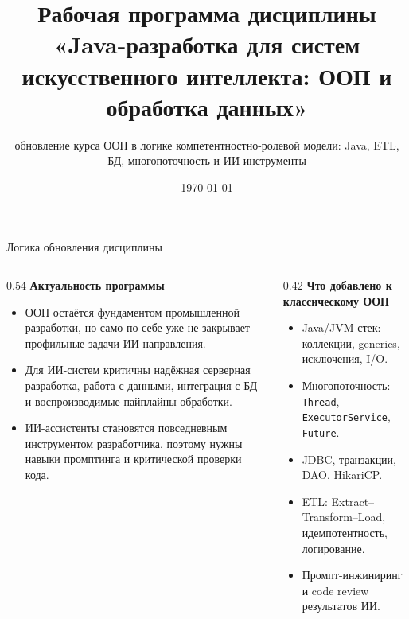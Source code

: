 \documentclass[aspectratio=169,10pt]{beamer}
\title[РПД: Java-разработка для систем ИИ]{Рабочая программа дисциплины\\«Java-разработка для систем искусственного интеллекта: ООП и обработка данных»}
\subtitle{обновление курса ООП в логике компетентностно-ролевой модели: Java, ETL, БД, многопоточность и ИИ-инструменты}
\date{\today}
\begin{document}
\begin{frame}
  \titlepage
\end{frame}

\begin{frame}{Логика обновления дисциплины}
\begin{columns}[T,onlytextwidth]
\begin{column}{0.54\textwidth}
\textbf{Актуальность программы}
\begin{itemize}
  \item ООП остаётся фундаментом промышленной разработки, но само по себе уже не закрывает профильные задачи ИИ-направления.
  \item Для ИИ-систем критичны надёжная серверная разработка, работа с данными, интеграция с БД и воспроизводимые пайплайны обработки.
  \item ИИ-ассистенты становятся повседневным инструментом разработчика, поэтому нужны навыки промптинга и критической проверки кода.
\end{itemize}
\end{column}
\begin{column}{0.42\textwidth}
\textbf{Что добавлено к классическому ООП}
\begin{itemize}
  \item Java/JVM-стек: коллекции, generics, исключения, I/O.
  \item Многопоточность: \texttt{Thread}, \texttt{ExecutorService}, \texttt{Future}.
  \item JDBC, транзакции, DAO, HikariCP.
  \item ETL: Extract--Transform--Load, идемпотентность, логирование.
  \item Промпт-инжиниринг и code review результатов ИИ.
\end{itemize}
\end{column}
\end{columns}
\end{frame}
\end{document}

